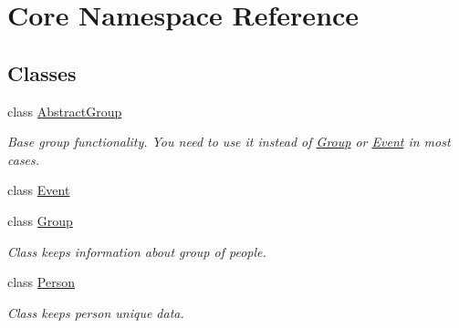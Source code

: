 \hypertarget{namespaceCore}{
\section{Core Namespace Reference}
\label{d3/d7a/namespaceCore}
}
\subsection*{Classes}
\begin{DoxyCompactItemize}
\item 
class \hyperlink{classCore_1_1AbstractGroup}{AbstractGroup}
\begin{DoxyCompactList}\small\item\em Base group functionality. You need to use it instead of \hyperlink{classCore_1_1Group}{Group} or \hyperlink{classCore_1_1Event}{Event} in most cases. \item\end{DoxyCompactList}\item 
class \hyperlink{classCore_1_1Event}{Event}
\item 
class \hyperlink{classCore_1_1Group}{Group}
\begin{DoxyCompactList}\small\item\em Class keeps information about group of people. \item\end{DoxyCompactList}\item 
class \hyperlink{classCore_1_1Person}{Person}
\begin{DoxyCompactList}\small\item\em Class keeps person unique data. \item\end{DoxyCompactList}\end{DoxyCompactItemize}
